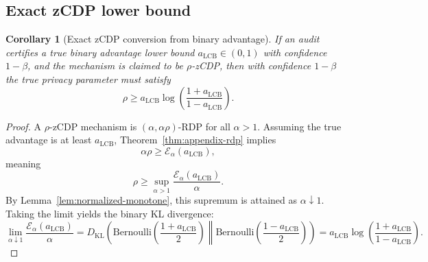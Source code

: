 \documentclass[10pt]{article}
\newtheorem{corollary}[theorem]{Corollary}
\newcommand{\KL}{D_{\mathrm{KL}}}
\newcommand{\Bern}{\mathrm{Bernoulli}}
\begin{document}
\subsection{Exact zCDP lower bound}

\begin{corollary}[Exact zCDP conversion from binary advantage]
\label{cor:appendix-zcdp}
If an audit certifies a true binary advantage lower bound $a_{\mathrm{LCB}}\in(0,1)$ with confidence $1-\beta$, and the mechanism is claimed to be $\rho$-zCDP, then with confidence $1-\beta$ the true privacy parameter must satisfy
\[
\rho \ge a_{\mathrm{LCB}}\log\!\left(\frac{1+a_{\mathrm{LCB}}}{1-a_{\mathrm{LCB}}}\right).
\]
\end{corollary}

\begin{proof}
A $\rho$-zCDP mechanism is $(\alpha,\alpha\rho)$-RDP for all $\alpha>1$. Assuming the true advantage is at least $a_{\mathrm{LCB}}$, Theorem~\ref{thm:appendix-rdp} implies
\[
\alpha\rho \ge \mathcal E_\alpha(a_{\mathrm{LCB}}),
\]
meaning
\[
\rho \ge \sup_{\alpha>1}\frac{\mathcal E_\alpha(a_{\mathrm{LCB}})}{\alpha}.
\]
By Lemma~\ref{lem:normalized-monotone}, this supremum is attained as $\alpha\downarrow1$. Taking the limit yields the binary KL divergence:
\[
\lim_{\alpha\downarrow1}\frac{\mathcal E_\alpha(a_{\mathrm{LCB}})}{\alpha}
=
\KL\!\left(
\Bern\!\left(\frac{1+a_{\mathrm{LCB}}}{2}\right)
\middle\|
\Bern\!\left(\frac{1-a_{\mathrm{LCB}}}{2}\right)
\right)
=
a_{\mathrm{LCB}}\log\!\left(\frac{1+a_{\mathrm{LCB}}}{1-a_{\mathrm{LCB}}}\right).
\]
\end{proof}
\end{document}
